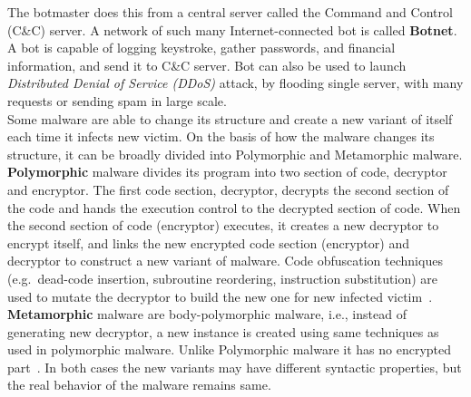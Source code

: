 The botmaster does this from a central server called the Command and Control (C\&C) server.
A network of such many Internet-connected bot is called \textbf{Botnet}.
A bot is capable of logging keystroke, gather passwords, and financial information, and send it to C\&C server.
Bot can also be used to launch \emph{Distributed Denial of Service (DDoS)} attack, by flooding single server, with many requests or sending spam in large scale.\\
Some malware are able to change its structure and create a new variant of itself each time it infects new victim.
On the basis of how the malware changes its structure, it can be broadly divided into Polymorphic and Metamorphic malware.
\textbf{Polymorphic} malware divides its program into two section of code, decryptor and encryptor.
The first code section, decryptor, decrypts the second section of the code and hands the execution control to the decrypted section of code.
When the second section of code (encryptor) executes, it creates a new decryptor to encrypt itself, and links the new encrypted code section (encryptor) and decryptor to construct a new variant of malware.
Code obfuscation techniques (e.g.\ dead-code insertion, subroutine reordering, instruction substitution) are used to mutate the decryptor to build the new one for new infected victim~\cite[]{rad2011evolution}.
\textbf{Metamorphic} malware are body-polymorphic malware, i.e., instead of generating new decryptor, a new instance is created using same techniques as used in polymorphic malware.
Unlike Polymorphic malware it has no encrypted part~\cite[]{rad2012camouflage}.
In both cases the new variants may have different syntactic properties, but the real behavior of the malware remains same.\\

